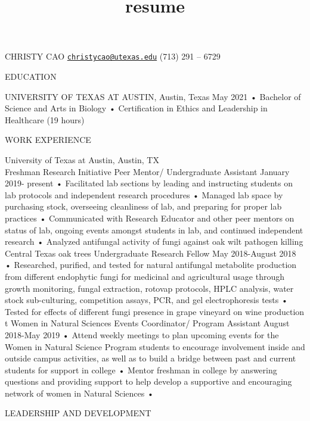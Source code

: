 \documentclass[]{article}
\title{resume}
\author{}
\date{\vspace{-2.5em}}
\begin{document}
\maketitle

CHRISTY CAO
\href{mailto:christycao@utexas.edu}{\nolinkurl{christycao@utexas.edu}}
(713) 291 -- 6729

EDUCATION

UNIVERSITY OF TEXAS AT AUSTIN, Austin, Texas May 2021 • Bachelor of
Science and Arts in Biology • Certification in Ethics and Leadership in
Healthcare (19 hours)

WORK EXPERIENCE

University of Texas at Austin, Austin, TX\\
Freshman Research Initiative Peer Mentor/ Undergraduate Assistant
January 2019- present • Facilitated lab sections by leading and
instructing students on lab protocols and independent research
procedures • Managed lab space by purchasing stock, overseeing
cleanliness of lab, and preparing for proper lab practices •
Communicated with Research Educator and other peer mentors on status of
lab, ongoing events amongst students in lab, and continued independent
research • Analyzed antifungal activity of fungi against oak wilt
pathogen killing Central Texas oak trees Undergraduate Research Fellow
May 2018-August 2018 • Researched, purified, and tested for natural
antifungal metabolite production from different endophytic fungi for
medicinal and agricultural usage through growth monitoring, fungal
extraction, rotovap protocols, HPLC analysis, water stock sub-culturing,
competition assays, PCR, and gel electrophoresis tests • Tested for
effects of different fungi presence in grape vineyard on wine production
t Women in Natural Sciences Events Coordinator/ Program Assistant August
2018-May 2019 • Attend weekly meetings to plan upcoming events for the
Women in Natural Science Program students to encourage involvement
inside and outside campus activities, as well as to build a bridge
between past and current students for support in college • Mentor
freshman in college by answering questions and providing support to help
develop a supportive and encouraging network of women in Natural
Sciences •

LEADERSHIP AND DEVELOPMENT
\end{document}
